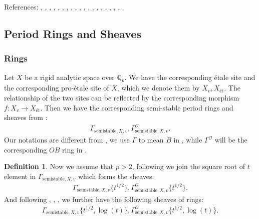\documentclass[12pt]{book}
\theoremstyle{definition}
\newtheorem{definition}{Definition}
\begin{document}
\noindent References: \cite{Sch1}, \cite{Sch2}, \cite{FS}, \cite{KL1}, \cite{KL2}, \cite{BL1}, \cite{BL2}, \cite{BS}, \cite{BHS}, \cite{Fon1}, \cite{CS1}, \cite{CS2}, \cite{BK}, \cite{BBK}, \cite{BBBK}, \cite{KKM}, \cite{KM}, \cite{LZ}, \cite{Shi}, \cite{M}.


\subsection{Period Rings and Sheaves}


\subsubsection{Rings}

\noindent Let $X$ be a rigid analytic space over $\mathbb{Q}_p$. We have the corresponding \'etale site and the corresponding pro-\'etale site of $X$, which we denote them by $X_{v},X_\text{\'et}$. The relationship of the two sites can be reflected by the corresponding morphism $f:X_{v}\longrightarrow X_\text{\'et}$. Then we have the corresponding semi-stable period rings and sheaves from \cite{Shi}:
\begin{align}
\Gamma_{\text{semistable},X,v}, \Gamma^\mathcal{O}_{\text{semistable},X,v}.
\end{align}
Our notations are different from \cite{Shi}, we use $\Gamma$ to mean $B$ in \cite{Shi}, while $\Gamma^\mathcal{O}$ will be the corresponding $OB$ ring in \cite{Shi}.\\

\begin{definition}
\indent Now we assume that $p>2$, following \cite{BS} we join the square root of $t$ element in $\Gamma_{\text{semistable},X,v}$ which forms the sheaves:
\begin{align}
\Gamma_{\text{semistable},X,v}\{t^{1/2}\},\Gamma^\mathcal{O}_{\text{semistable},X,v}\{t^{1/2}\}.
\end{align}
And following \cite{BL1}, \cite{BL2}, \cite{Fon1}, \cite{BHS} we further have the following sheaves of rings:
\begin{align}
\Gamma_{\text{semistable},X,v}\{t^{1/2},\log(t)\},\Gamma^\mathcal{O}_{\text{semistable},X,v}\{t^{1/2},\log(t)\}.
\end{align}
\end{definition}
\end{document}

